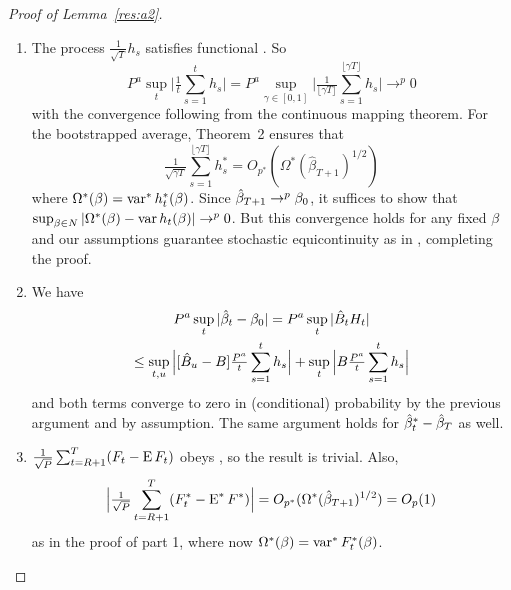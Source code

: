 \documentclass[12pt,fleqn]{article}
\begin{document}
\begin{proof}[Proof of Lemma~\ref{res:a2}]
  \begin{enumerate}
  \item The process $\tfrac{1}{\sqrt{T}} h_{s}$ satisfies
     functional \clt.  So
    \begin{equation}
      P^a \sup_t \Big| \tfrac1t \sum_{s=1}^t h_{s} \Big| =
      P^a \sup_{\gamma \in [0,1]} \Big| \tfrac{1}{\lfloor \gamma
        T\rfloor} \sum_{s=1}^{\lfloor \gamma T \rfloor} h_{s} \Big| \to^{p} 0
    \end{equation}
    with the convergence following from the continuous mapping
    theorem.  For the bootstrapped average, 
    Theorem~2 ensures that
    \begin{equation}
      \tfrac{1}{\sqrt{\gamma
          T}} \sum_{s=1}^{\lfloor \gamma T \rfloor} h_{s}^*
      = O_{p^*}(\Omega^*(\hat\beta_{T+1})^{1/2})
    \end{equation}
    where $\Omega^*(\beta) = \operatorname{var}^* h_t^*(\beta)$.  Since
    $\hat\beta_{T+1} \to^p \btrue$, it suffices to show that
    $\sup_{\beta \in N} | \Omega^*(\beta) - \operatorname{var} h_t(\beta) | \to^p
    0$.  But this convergence holds for any fixed $\beta$ and our
    assumptions guarantee stochastic equicontinuity as in
    \citet{JoD:00} \citep[also see][]{Dav:94}, completing the proof.

  \item We have
    \begin{multline}
      P^a \sup_t | \hat{\beta}_t - \btrue | = P^a \sup_t |\hat{B}_{t}
      H_{t}| \\ \leq \sup_{t,u} \Big| [ \hat{B}_u - B]
      \tfrac{P^a}{t} \sum_{s=1}^t h_{s} \Big| + \sup_{t} \Big|
      B \tfrac{P^a}{t} \sum_{s=1}^t h_{s} \Big|
    \end{multline}
    and both terms converge to zero in (conditional) probability by
    the previous argument and by assumption.  The same argument holds
    for $\hat{\beta}_t^{*} - \btrue[*]$ as well.
  \item $\tfrac{1}{\sqrt{P}} \sum_{t=R+1}^T (F_t - \operatorname{E} F_t)$ obeys
     \clt, so the result is trivial.  Also,
   \begin{equation}
     \Big\lvert\tfrac{1}{\sqrt{P}} \sum_{t=R+1}^T
     ( F_t^* - \operatorname{E}^* F^*)\Big\rvert = O_{p^*}(\Omega^*(\hat\beta_{T+1})^{1/2}) = O_p(1)
    \end{equation}
    as in the proof of part 1, where now $\Omega^*(\beta) = \operatorname{var}^* F_t^*(\beta)$.
  \end{enumerate}
\end{proof}
\end{document}
